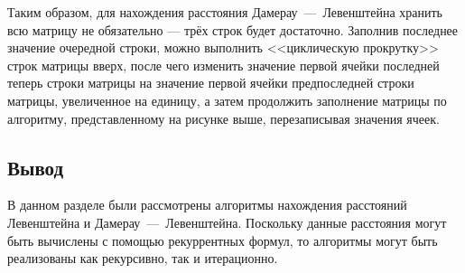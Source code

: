 Таким образом, для нахождения расстояния Дамерау~---~Левенштейна хранить всю матрицу не обязательно --- трёх строк будет достаточно.
Заполнив последнее значение очередной строки, можно выполнить <<циклическую прокрутку>> строк матрицы вверх, после чего изменить значение первой ячейки последней теперь строки матрицы на значение первой ячейки предпоследней строки матрицы, увеличенное на единицу, а затем продолжить заполнение матрицы по алгоритму, представленному на рисунке выше, перезаписывая значения ячеек.

\subsection*{Вывод}

В данном разделе были рассмотрены алгоритмы нахождения расстояний Левенштейна и Дамерау~---~Левенштейна.
Поскольку данные расстояния могут быть вычислены с помощью рекуррентных формул, то алгоритмы могут быть реализованы как рекурсивно, так и итерационно.
